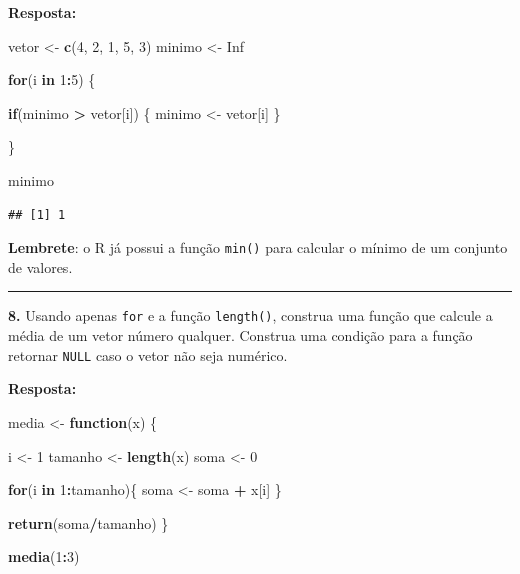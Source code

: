 \documentclass[
]{book}
\newenvironment{Shaded}{\begin{snugshade}}{\end{snugshade}}
\newcommand{\ControlFlowTok}[1]{\textcolor[rgb]{0.13,0.29,0.53}{\textbf{#1}}}
\newcommand{\DecValTok}[1]{\textcolor[rgb]{0.00,0.00,0.81}{#1}}
\newcommand{\KeywordTok}[1]{\textcolor[rgb]{0.13,0.29,0.53}{\textbf{#1}}}
\newcommand{\NormalTok}[1]{#1}
\newcommand{\OperatorTok}[1]{\textcolor[rgb]{0.81,0.36,0.00}{\textbf{#1}}}
\newcommand{\OtherTok}[1]{\textcolor[rgb]{0.56,0.35,0.01}{#1}}
\newcommand{\StringTok}[1]{\textcolor[rgb]{0.31,0.60,0.02}{#1}}
\begin{document}
\textbf{Resposta:}

\begin{Shaded}
\begin{Highlighting}[]
\NormalTok{vetor <{-}}\StringTok{ }\KeywordTok{c}\NormalTok{(}\DecValTok{4}\NormalTok{, }\DecValTok{2}\NormalTok{, }\DecValTok{1}\NormalTok{, }\DecValTok{5}\NormalTok{, }\DecValTok{3}\NormalTok{)}
\NormalTok{minimo <{-}}\StringTok{ }\OtherTok{Inf}

\ControlFlowTok{for}\NormalTok{(i }\ControlFlowTok{in} \DecValTok{1}\OperatorTok{:}\DecValTok{5}\NormalTok{) \{}
  
  \ControlFlowTok{if}\NormalTok{(minimo }\OperatorTok{>}\StringTok{ }\NormalTok{vetor[i]) \{}
\NormalTok{    minimo <{-}}\StringTok{ }\NormalTok{vetor[i]}
\NormalTok{  \}}
  
\NormalTok{\}}

\NormalTok{minimo}
\end{Highlighting}
\end{Shaded}

\begin{verbatim}
## [1] 1
\end{verbatim}

\textbf{Lembrete}: o R já possui a função \texttt{min()} para calcular o mínimo de um conjunto de valores.

\begin{center}\rule{0.5\linewidth}{0.5pt}\end{center}

\textbf{8.} Usando apenas \texttt{for} e a função \texttt{length()}, construa uma função que calcule a média de um vetor número qualquer. Construa uma condição para a função retornar \texttt{NULL} caso o vetor não seja numérico.

\textbf{Resposta:}

\begin{Shaded}
\begin{Highlighting}[]
\NormalTok{media <{-}}\StringTok{ }\ControlFlowTok{function}\NormalTok{(x) \{}
  
\NormalTok{  i <{-}}\StringTok{ }\DecValTok{1}
\NormalTok{  tamanho <{-}}\StringTok{ }\KeywordTok{length}\NormalTok{(x)}
\NormalTok{  soma <{-}}\StringTok{ }\DecValTok{0}
  
  \ControlFlowTok{for}\NormalTok{(i }\ControlFlowTok{in} \DecValTok{1}\OperatorTok{:}\NormalTok{tamanho)\{}
\NormalTok{    soma <{-}}\StringTok{ }\NormalTok{soma }\OperatorTok{+}\StringTok{ }\NormalTok{x[i]}
\NormalTok{  \}}
  
  \KeywordTok{return}\NormalTok{(soma}\OperatorTok{/}\NormalTok{tamanho)}
\NormalTok{\}}

\KeywordTok{media}\NormalTok{(}\DecValTok{1}\OperatorTok{:}\DecValTok{3}\NormalTok{)}
\end{Highlighting}
\end{Shaded}
\end{document}

